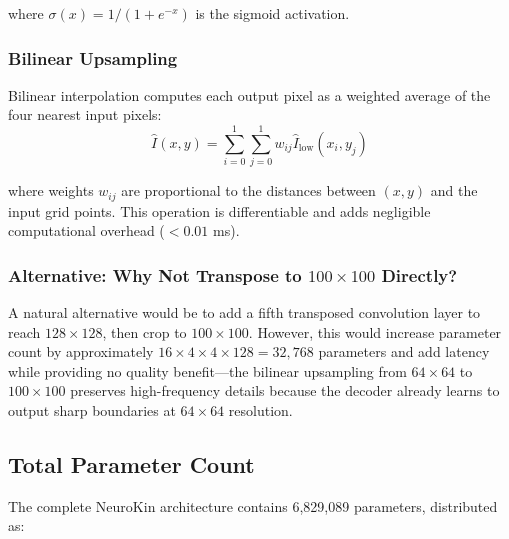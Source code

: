 \documentclass[12pt,a4paper,oneside]{report}
\begin{document}
where $\sigma(x) = 1/(1 + e^{-x})$ is the sigmoid activation.

\subsubsection{Bilinear Upsampling}

Bilinear interpolation computes each output pixel as a weighted average of the four nearest input pixels:
\begin{equation}
\hat{I}(x,y) = \sum_{i=0}^{1}\sum_{j=0}^{1} w_{ij} \hat{I}_{\text{low}}(x_i, y_j)
\end{equation}

where weights $w_{ij}$ are proportional to the distances between $(x,y)$ and the input grid points. This operation is differentiable and adds negligible computational overhead ($<0.01$ ms).

\subsubsection{Alternative: Why Not Transpose to $100 \times 100$ Directly?}

A natural alternative would be to add a fifth transposed convolution layer to reach $128 \times 128$, then crop to $100 \times 100$. However, this would increase parameter count by approximately $16 \times 4 \times 4 \times 128 = 32,768$ parameters and add latency while providing no quality benefit—the bilinear upsampling from $64 \times 64$ to $100 \times 100$ preserves high-frequency details because the decoder already learns to output sharp boundaries at $64 \times 64$ resolution.

\subsection{Total Parameter Count}

The complete NeuroKin architecture contains 6,829,089 parameters, distributed as:
\end{document}
